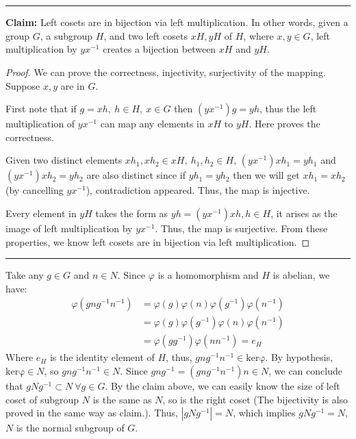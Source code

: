 \documentclass[12pt]{article}
\begin{document}
\section{} %

\noindent\rule{\textwidth}{1pt}

\textbf{Claim: } Left cosets are in bijection via left multiplication. In other words, given a group $G$, a subgroup $H$, and two left cosets $xH, yH$ of $H$, where $x,y\in G$, left multiplication by $yx^{-1}$ creates a bijection between $xH$ and $yH$.

\begin{proof}
We can prove the correctness, injectivity, surjectivity of the mapping. Suppose $x,y$ are in $G$.

First note that if $g=xh,\ h\in H,\ x\in G$ then $(yx^{-1})g=yh$, thus the left multiplication of $yx^{-1}$ can map any elements in $xH$ to $yH$. Here proves the correctness.

Given two distinct elements $xh_1, xh_2\in xH,\ h_1,h_2\in H$, $(yx^{-1})xh_1=yh_1$ and $(yx^{-1})xh_2=yh_2$ are also distinct since if $yh_1=yh_2$ then we will get $xh_1=xh_2$ (by cancelling $yx^{-1}$), contradiction appeared. Thus, the map is injective.

Every element in $yH$ takes the form as $yh=(yx^{-1})xh,h\in H$, it arises as the image of left multiplication by $yx^{-1}$. Thus, the map is surjective. From these properties, we know left cosets are in bijection via left multiplication.
\end{proof}

\noindent\rule{\textwidth}{1pt}

Take any $g\in G$ and $n\in N$. Since $\varphi$ is a homomorphism and $H$ is abelian, we have:
\begin{align*}
    \varphi(gng^{-1}n^{-1}) &=\varphi(g)\varphi(n)\varphi(g^{-1})\varphi(n^{-1}) \\
    &= \varphi(g)\varphi(g^{-1})\varphi(n)\varphi(n^{-1}) \\
    &= \varphi(gg^{-1})\varphi(nn^{-1})=e_{H}
\end{align*}
Where $e_{H}$ is the identity element of $H$, thus, $gng^{-1}n^{-1}\in\mathrm{ker\varphi}$. By hypothesis, $\mathrm{ker\varphi}\in N$, so $gng^{-1}n^{-1}\in N$. Since $gng^{-1}=(gng^{-1}n^{-1})n\in N$, we can conclude that $gNg^{-1}\subset N\ \forall g\in G$. By the claim above, we can easily know the size of left coset of subgroup $N$ is the same as $N$, so is the right coset (The bijectivity is also proved in the same way as claim.). Thus, $|gNg^{-1}|=N$, which implies $gNg^{-1}=N$, $N$ is the normal subgroup of $G$.
\end{document}

